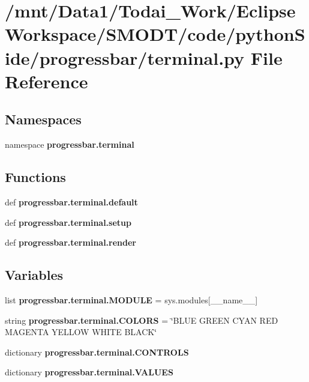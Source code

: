 \section{/mnt/\-Data1/\-Todai\-\_\-\-Work/\-Eclipse\-Workspace/\-S\-M\-O\-D\-T/code/python\-Side/progressbar/terminal.py File Reference}
\label{terminal_8py}
\subsection*{Namespaces}
\begin{DoxyCompactItemize}
\item 
namespace {\bf progressbar.\-terminal}
\end{DoxyCompactItemize}
\subsection*{Functions}
\begin{DoxyCompactItemize}
\item 
def {\bf progressbar.\-terminal.\-default}
\item 
def {\bf progressbar.\-terminal.\-setup}
\item 
def {\bf progressbar.\-terminal.\-render}
\end{DoxyCompactItemize}
\subsection*{Variables}
\begin{DoxyCompactItemize}
\item 
list {\bf progressbar.\-terminal.\-M\-O\-D\-U\-L\-E} = sys.\-modules[\-\_\-\-\_\-name\-\_\-\-\_\-]
\item 
string {\bf progressbar.\-terminal.\-C\-O\-L\-O\-R\-S} = \char`\"{}B\-L\-U\-E G\-R\-E\-E\-N C\-Y\-A\-N R\-E\-D M\-A\-G\-E\-N\-T\-A Y\-E\-L\-L\-O\-W W\-H\-I\-T\-E B\-L\-A\-C\-K\char`\"{}
\item 
dictionary {\bf progressbar.\-terminal.\-C\-O\-N\-T\-R\-O\-L\-S}
\item 
dictionary {\bf progressbar.\-terminal.\-V\-A\-L\-U\-E\-S}
\end{DoxyCompactItemize}
